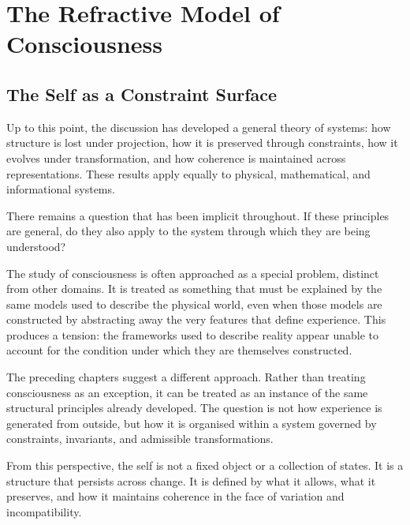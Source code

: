 \documentclass[11pt,openany]{book}
\begin{document}

\chapter{The Refractive Model of Consciousness}
\label{ch:refractive-consciousness}

\section*{ The Self as a Constraint Surface}

Up to this point, the discussion has developed a general theory of systems: how structure is lost under projection, how it is preserved through constraints, how it evolves under transformation, and how coherence is maintained across representations. These results apply equally to physical, mathematical, and informational systems.

There remains a question that has been implicit throughout. If these principles are general, do they also apply to the system through which they are being understood?

The study of consciousness is often approached as a special problem, distinct from other domains. It is treated as something that must be explained by the same models used to describe the physical world, even when those models are constructed by abstracting away the very features that define experience. This produces a tension: the frameworks used to describe reality appear unable to account for the condition under which they are themselves constructed.

The preceding chapters suggest a different approach. Rather than treating consciousness as an exception, it can be treated as an instance of the same structural principles already developed. The question is not how experience is generated from outside, but how it is organised within a system governed by constraints, invariants, and admissible transformations.

From this perspective, the self is not a fixed object or a collection of states. It is a structure that persists across change. It is defined by what it allows, what it preserves, and how it maintains coherence in the face of variation and incompatibility.
\end{document}

